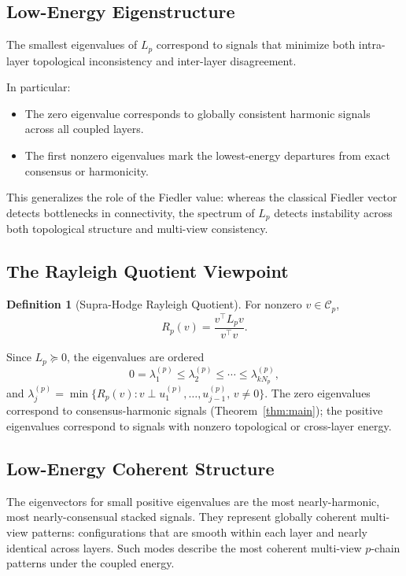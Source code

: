 \documentclass[11pt]{article}
\theoremstyle{definition}
\newtheorem{definition}[theorem]{Definition}
\theoremstyle{remark}
\newcommand{\Rp}{R_p}
\newcommand{\calC}{\mathcal{C}}
\begin{document}
\subsection{Low-Energy Eigenstructure}

The smallest eigenvalues of $L_p$ correspond to signals that minimize both intra-layer topological inconsistency and inter-layer disagreement.

In particular:
\begin{itemize}
\item The zero eigenvalue corresponds to globally consistent harmonic signals across all coupled layers.
\item The first nonzero eigenvalues mark the lowest-energy departures from exact consensus or harmonicity.
\end{itemize}

This generalizes the role of the Fiedler value: whereas the classical Fiedler vector detects bottlenecks in connectivity, the spectrum of $L_p$ detects instability across both topological structure and multi-view consistency.

\subsection{The Rayleigh Quotient Viewpoint}

\begin{definition}[Supra-Hodge Rayleigh Quotient]
For nonzero $v\in\calC_p$,
\[
  \Rp(v) = \frac{v^\top L_p v}{v^\top v}.
\]
\end{definition}

Since $L_p\succeq 0$, the eigenvalues are ordered
\[
  0 = \lambda_1^{(p)} \leq \lambda_2^{(p)} \leq \cdots \leq \lambda_{kN_p}^{(p)},
\]
and $\lambda_j^{(p)} = \min\{\Rp(v) : v\perp u_1^{(p)},\dots,u_{j-1}^{(p)},\, v\neq 0\}$.
The zero eigenvalues correspond to consensus-harmonic signals
(Theorem~\ref{thm:main}); the positive eigenvalues correspond to signals with
nonzero topological or cross-layer energy.

\subsection{Low-Energy Coherent Structure}

The eigenvectors for small positive eigenvalues are the most nearly-harmonic,
most nearly-consensual stacked signals. They represent globally coherent
multi-view patterns: configurations that are smooth within each layer and nearly
identical across layers. Such modes describe the most coherent multi-view
$p$-chain patterns under the coupled energy.
\end{document}
